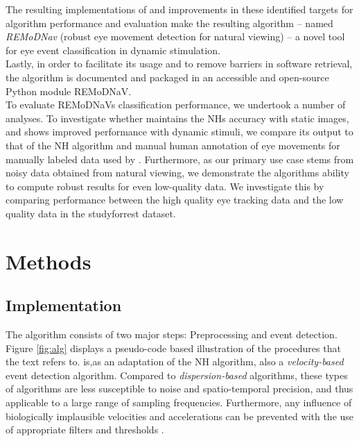 The resulting implementations of and improvements in these identified targets for algorithm performance and evaluation make the resulting algorithm -- named \textit{REMoDNav} (robust eye movement detection for natural viewing) -- a novel tool for eye event classification in dynamic stimulation.\\
Lastly, in order to facilitate its usage and to remove barriers in software retrieval, the \remodnav algorithm is documented and packaged in an accessible and open-source Python module REMoDNaV. \\

To evaluate REMoDNaVs classification performance, we undertook a number of analyses. To investigate whether \remodnav maintains the NHs accuracy with static images, and shows improved performance with dynamic stimuli, we compare its output to that of the NH algorithm and manual human annotation of eye movements for manually labeled data used by \cite{Andersson2017}. Furthermore, as our primary use case stems from noisy data obtained from natural viewing, we demonstrate the algorithms ability to compute robust results for even low-quality data. We investigate this by comparing performance between the high quality eye tracking data and the low quality data in the studyforrest dataset.




\section*{Methods}\label{methods}


\subsection*{\remodnav Implementation}\label{impl}
 

The algorithm consists of two major steps: Preprocessing and event detection. Figure \ref{fig:alg} displays a pseudo-code based illustration of the procedures that the text refers to. \remodnav is,as an adaptation of the NH algorithm, also a \textit{velocity-based} event detection algorithm. Compared to \textit{dispersion-based} algorithms, these types of algorithms are less susceptible to noise and spatio-temporal precision, and thus applicable to a large range of sampling frequencies. Furthermore, any influence of biologically implausible velocities and accelerations can be prevented with the use of appropriate filters and thresholds \citep{holmqvist2011eye}.

